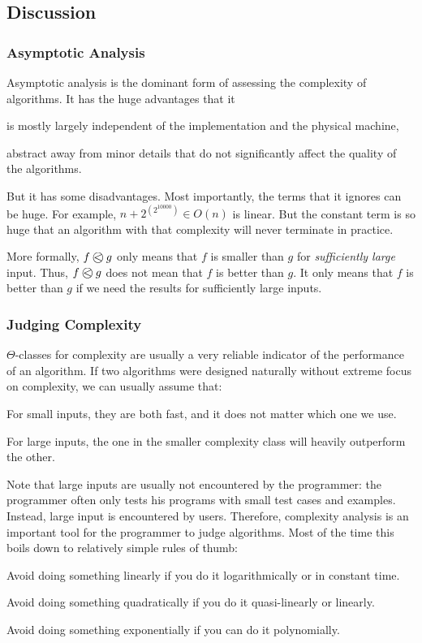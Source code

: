 \subsection{Discussion}

\subsubsection{Asymptotic Analysis}

Asymptotic analysis is the dominant form of assessing the complexity of algorithms.
It has the huge advantages that it
\begin{compactitem}
 \item is mostly largely independent of the implementation and the physical machine,
 \item abstract away from minor details that do not significantly affect the quality of the algorithms.
\end{compactitem}

But it has some disadvantages.
Most importantly, the terms that it ignores can be huge.
For example, $n+2^{(2^10000)}\in O(n)$ is linear.
But the constant term is so huge that an algorithm with that complexity will never terminate in practice.

More formally, $\Oleq{f}{g}$ only means that $f$ is smaller than $g$ for \emph{sufficiently large} input.
Thus, $\Oleq{f}{g}$ does not mean that $f$ is better than $g$.
It only means that $f$ is better than $g$ if we need the results for sufficiently large inputs.

\subsubsection{Judging Complexity}

$\Theta$-classes for complexity are usually a very reliable indicator of the performance of an algorithm.
If two algorithms were designed naturally without extreme focus on complexity, we can usually assume that:
\begin{compactitem}
 \item For small inputs, they are both fast, and it does not matter which one we use.
 \item For large inputs, the one in the smaller complexity class will heavily outperform the other.
\end{compactitem}

Note that large inputs are usually not encountered by the programmer: the programmer often only tests his programs with small test cases and examples.
Instead, large input is encountered by users.
Therefore, complexity analysis is an important tool for the programmer to judge algorithms.
Most of the time this boils down to relatively simple rules of thumb:
\begin{compactitem} 
 \item Avoid doing something linearly if you do it logarithmically or in constant time.
 \item Avoid doing something quadratically if you do it quasi-linearly or linearly.
 \item Avoid doing something exponentially if you can do it polynomially.
\end{compactitem}

